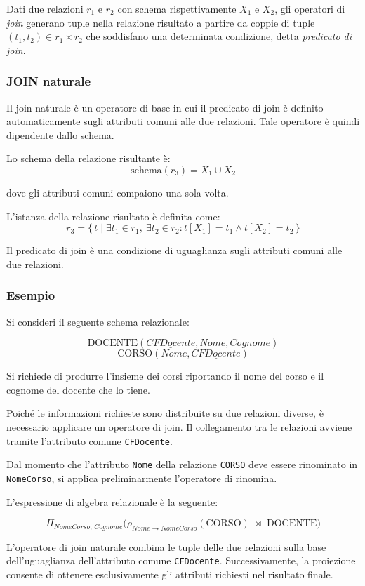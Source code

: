 Dati due relazioni $r_1$ e $r_2$ con schema rispettivamente $X_1$ e $X_2$, 
gli operatori di \textit{join} generano tuple nella relazione risultato 
a partire da coppie di tuple $(t_1, t_2) \in r_1 \times r_2$ che soddisfano 
una determinata condizione, detta \textit{predicato di join}.

\subsubsection{JOIN naturale}
Il join naturale è un operatore di base in cui il predicato di join è 
definito automaticamente sugli attributi comuni alle due relazioni.
Tale operatore è quindi dipendente dallo schema.

Lo schema della relazione risultante è:
\[
\text{schema}(r_3) = X_1 \cup X_2
\]

dove gli attributi comuni compaiono una sola volta.

L'istanza della relazione risultato è definita come:
\[
r_3 = \{\, t \mid \exists t_1 \in r_1,\ \exists t_2 \in r_2 :
t[X_1] = t_1 \land t[X_2] = t_2 \,\}
\]

Il predicato di join è una condizione di uguaglianza sugli attributi comuni
alle due relazioni.
\subsubsection*{Esempio}

Si consideri il seguente schema relazionale:

\[
\text{DOCENTE}(\underline{CFDocente}, Nome, Cognome)
\]
\[
\text{CORSO}(Nome, \underline{CFDocente})
\]

Si richiede di produrre l’insieme dei corsi riportando il nome del corso
e il cognome del docente che lo tiene.

Poiché le informazioni richieste sono distribuite su due relazioni
diverse, è necessario applicare un operatore di join.
Il collegamento tra le relazioni avviene tramite l’attributo comune
\texttt{CFDocente}.

Dal momento che l’attributo \texttt{Nome} della relazione \texttt{CORSO}
deve essere rinominato in \texttt{NomeCorso}, si applica preliminarmente
l’operatore di rinomina.

L’espressione di algebra relazionale è la seguente:

\[
\Pi_{NomeCorso,\, Cognome}
\Big(
\rho_{Nome \rightarrow NomeCorso}(\text{CORSO})
\;\bowtie\;
\text{DOCENTE}
\Big)
\]

L’operatore di join naturale combina le tuple delle due relazioni
sulla base dell’uguaglianza dell’attributo comune \texttt{CFDocente}.
Successivamente, la proiezione consente di ottenere esclusivamente
gli attributi richiesti nel risultato finale.

